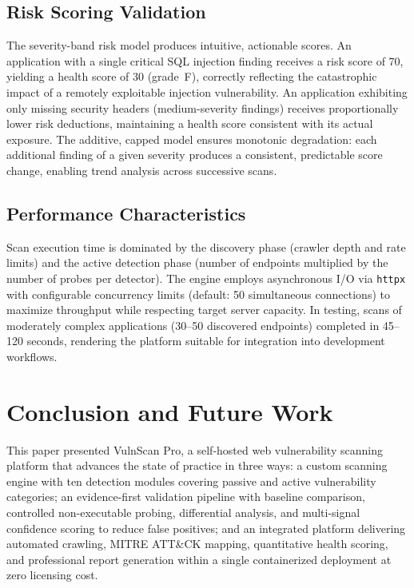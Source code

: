 \documentclass[conference]{IEEEtran}
\begin{document}
\subsection{Risk Scoring Validation}

The severity-band risk model produces intuitive, actionable scores. An application with a single critical SQL injection finding receives a risk score of 70, yielding a health score of 30 (grade~F), correctly reflecting the catastrophic impact of a remotely exploitable injection vulnerability. An application exhibiting only missing security headers (medium-severity findings) receives proportionally lower risk deductions, maintaining a health score consistent with its actual exposure. The additive, capped model ensures monotonic degradation: each additional finding of a given severity produces a consistent, predictable score change, enabling trend analysis across successive scans.

\subsection{Performance Characteristics}

Scan execution time is dominated by the discovery phase (crawler depth and rate limits) and the active detection phase (number of endpoints multiplied by the number of probes per detector). The engine employs asynchronous I/O via \texttt{httpx} with configurable concurrency limits (default: 50 simultaneous connections) to maximize throughput while respecting target server capacity. In testing, scans of moderately complex applications (30--50 discovered endpoints) completed in 45--120 seconds, rendering the platform suitable for integration into development workflows.

\section{Conclusion and Future Work}

This paper presented VulnScan Pro, a self-hosted web vulnerability scanning platform that advances the state of practice in three ways: a custom scanning engine with ten detection modules covering passive and active vulnerability categories; an evidence-first validation pipeline with baseline comparison, controlled non-executable probing, differential analysis, and multi-signal confidence scoring to reduce false positives; and an integrated platform delivering automated crawling, MITRE ATT\&CK mapping, quantitative health scoring, and professional report generation within a single containerized deployment at zero licensing cost.
\end{document}
